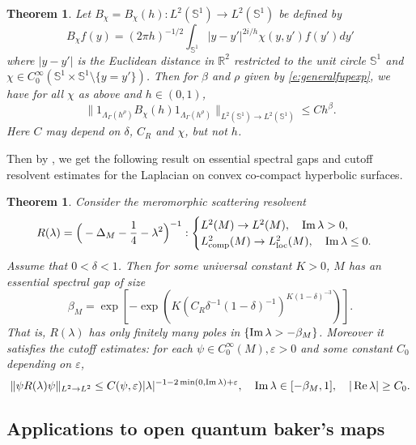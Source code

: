 \documentclass[reqno,12pt,letterpaper]{amsart}
\newtheorem{thm}[prop]{Theorem}
\numberwithin{equation}{section}
\numberwithin{prop}{section}
\renewcommand{\Re}{\mathop{\rm Re}\nolimits}
\renewcommand{\Im}{\mathop{\rm Im}\nolimits}
\DeclareMathOperator{\comp}{comp}
\DeclareMathOperator{\loc}{loc}
\begin{document}
\begin{thm}
  \label{t:hyperfup}
Let $B_\chi=B_\chi(h):L^2(\mathbb{S}^1)\to L^2(\mathbb{S}^1)$ be defined by
$$B_\chi f(y)=(2\pi h)^{-1/2}\int_{\mathbb{S}^1}|y-y'|^{2i/h}\chi(y,y')f(y')dy'$$
where $|y-y'|$ is the Euclidean distance in $\mathbb{R}^2$ restricted to the unit circle $\mathbb{S}^1$ and $\chi\in C_0^\infty(\mathbb{S}^1\times\mathbb{S}^1\setminus\{y=y'\})$. Then for $\beta$ and $\rho$ given by \eqref{e:generalfupexp}, we have for all $\chi$ as above and $h\in(0,1)$,
$$\|1_{\Lambda_\Gamma(h^\rho)}B_\chi(h)1_{\Lambda_\Gamma(h^\rho)}\|_{L^2(\mathbb{S}^1)\to L^2(\mathbb{S}^1)}\leq Ch^\beta.$$
Here $C$ may depend on $\delta$, $C_R$ and $\chi$, but not $h$.
\end{thm}

Then by \cite[Theorem 3]{fup}, we get the following result on essential spectral gaps and cutoff resolvent estimates for the Laplacian on convex co-compact hyperbolic surfaces.

\begin{thm}
  \label{t:gap-hyper}
Consider the meromorphic scattering resolvent
$$
R(\lambda)=\Big(-\Delta_M-\frac{1}{4}-\lambda^2\Big)^{-1}:\begin{cases}
L^2(M)\to L^2(M),\quad \Im\lambda >0,\\
L^2_{\comp}(M)\to L^2_{\loc}(M),\quad \Im\lambda\leq 0.
\end{cases}
$$
Assume that $0<\delta<1$. Then for some universal constant $K>0$, $M$ has an essential spectral gap of size
\begin{equation}
  \label{e:gap-hyper}
\beta_M=\exp\left[-\exp\left(K(C_R\delta^{-1}(1-\delta)^{-1})^{K(1-\delta)^{-3}}\right)\right].
\end{equation}
That is, $R(\lambda)$ has only finitely many poles
in $\{\Im\lambda>-\beta_M\}$. Moreover it satisfies the cutoff estimates:
for each $\psi\in C_0^\infty(M),\varepsilon>0$
and some constant $C_0$ depending on $\varepsilon$,
$$
\|\psi R(\lambda)\psi\|_{L^2\to L^2}\leq C(\psi,\varepsilon)|\lambda|^{-1-2\min(0,\Im\lambda)+\varepsilon},\quad
\Im\lambda \in [-\beta_M,1],\quad
|\Re\lambda|\geq C_0.
$$
\end{thm}

\subsection{Applications to open quantum baker's maps}
\label{s:oqm}
\end{document}
